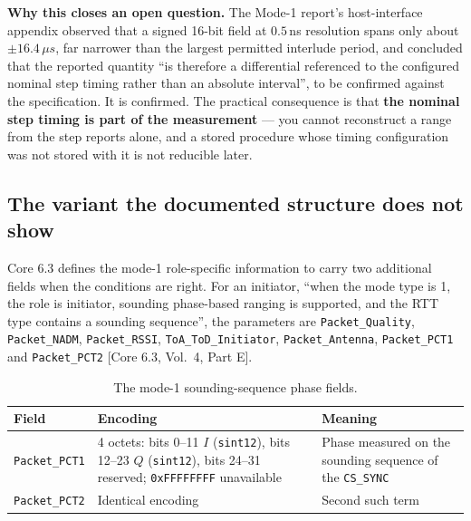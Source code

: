 \documentclass[11pt,a4paper]{article}
\newcommand{\us}{\,\ensuremath{\upmu}s}
\newcommand{\code}[1]{\texttt{\small #1}}
\providecommand{\upmu}{\mu}
\newcommand{\core}[1]{\textcolor{rulegrey}{\small[Core 6.3, #1]}}
\begin{document}
\begin{callout}
\textbf{Why this closes an open question.} The Mode-1 report's host-interface appendix observed that
a signed 16-bit field at $0.5$\,ns resolution spans only about $\pm16.4\us$, far narrower than the
largest permitted interlude period, and concluded that the reported quantity ``is therefore a
differential referenced to the configured nominal step timing rather than an absolute interval'', to
be confirmed against the specification. It is confirmed. The practical consequence is that
\textbf{the nominal step timing is part of the measurement} --- you cannot reconstruct a range from
the step reports alone, and a stored procedure whose timing configuration was not stored with it is
not reducible later.
\end{callout}

\subsection{The variant the documented structure does not show}
\label{sec:m1variant}

Core 6.3 defines the mode-1 role-specific information to carry two additional fields when the
conditions are right. For an initiator, ``when the mode type is 1, the role is initiator, sounding
phase-based ranging is supported, and the RTT type contains a sounding sequence'', the parameters are
\code{Packet\_\allowbreak{}Quality}, \code{Packet\_\allowbreak{}NADM}, \code{Packet\_\allowbreak{}RSSI}, \code{ToA\_\allowbreak{}ToD\_\allowbreak{}Initiator},
\code{Packet\_\allowbreak{}Antenna}, \code{Packet\_\allowbreak{}PCT1} and \code{Packet\_\allowbreak{}PCT2} \core{Vol.\ 4, Part E}.

\begin{table}[h]
\caption{The mode-1 sounding-sequence phase fields.}
\label{tab:pct12}
\centering\small
\begin{tabular}{@{}L{28mm}L{58mm}L{52mm}@{}}
\toprule
Field & Encoding & Meaning \\
\midrule
\code{Packet\_\allowbreak{}PCT1} & 4 octets: bits 0--11 $I$ (\code{sint12}), bits 12--23 $Q$ (\code{sint12}), bits 24--31 reserved; \code{0xFFFFFFFF} unavailable & Phase measured on the sounding sequence of the \code{CS\_\allowbreak{}SYNC} \\
\code{Packet\_\allowbreak{}PCT2} & Identical encoding & Second such term \\
\bottomrule
\end{tabular}
\end{table}
\end{document}

